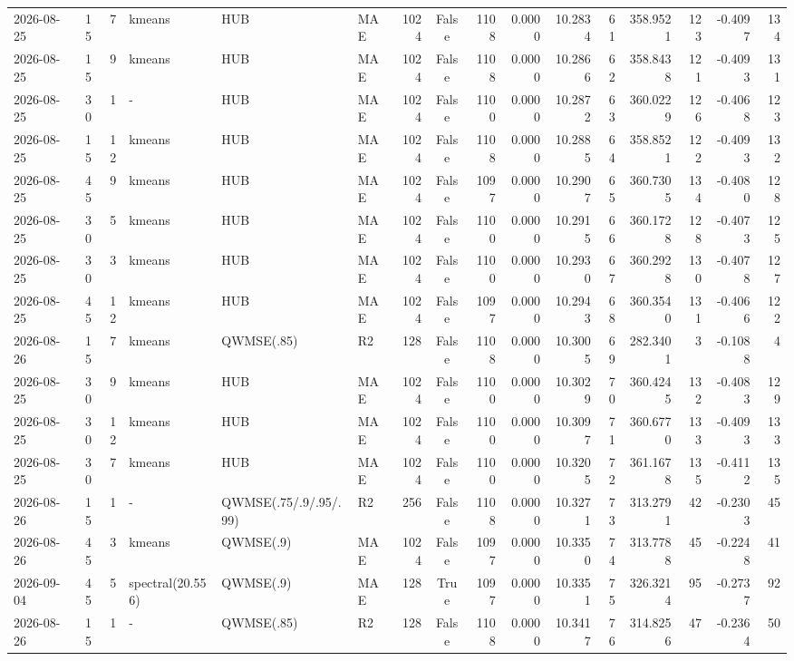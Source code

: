 \documentclass[10pt]{article}
\begin{document}
\begin{landscape}
\begin{longtable}{@{}lrrlllrcrrrrrrrr@{}}
2026-08-25 & 15 & 7 & kmeans & HUB & MAE & 1024 & False & 1108 & 0.0000 & 10.2834 & 61 & 358.9521 & 123 & -0.4097 & 134 \\
2026-08-25 & 15 & 9 & kmeans & HUB & MAE & 1024 & False & 1108 & 0.0000 & 10.2866 & 62 & 358.8438 & 121 & -0.4093 & 131 \\
2026-08-25 & 30 & 1 & - & HUB & MAE & 1024 & False & 1100 & 0.0000 & 10.2872 & 63 & 360.0229 & 126 & -0.4068 & 123 \\
2026-08-25 & 15 & 12 & kmeans & HUB & MAE & 1024 & False & 1108 & 0.0000 & 10.2885 & 64 & 358.8521 & 122 & -0.4093 & 132 \\
2026-08-25 & 45 & 9 & kmeans & HUB & MAE & 1024 & False & 1097 & 0.0000 & 10.2907 & 65 & 360.7305 & 134 & -0.4080 & 128 \\
2026-08-25 & 30 & 5 & kmeans & HUB & MAE & 1024 & False & 1100 & 0.0000 & 10.2915 & 66 & 360.1728 & 128 & -0.4073 & 125 \\
2026-08-25 & 30 & 3 & kmeans & HUB & MAE & 1024 & False & 1100 & 0.0000 & 10.2930 & 67 & 360.2928 & 130 & -0.4078 & 127 \\
2026-08-25 & 45 & 12 & kmeans & HUB & MAE & 1024 & False & 1097 & 0.0000 & 10.2943 & 68 & 360.3540 & 131 & -0.4066 & 122 \\
2026-08-26 & 15 & 7 & kmeans & QWMSE(.85) & R2 & 128 & False & 1108 & 0.0000 & 10.3005 & 69 & 282.3401 & 3 & -0.1088 & 4 \\
2026-08-25 & 30 & 9 & kmeans & HUB & MAE & 1024 & False & 1100 & 0.0000 & 10.3029 & 70 & 360.4245 & 132 & -0.4083 & 129 \\
2026-08-25 & 30 & 12 & kmeans & HUB & MAE & 1024 & False & 1100 & 0.0000 & 10.3097 & 71 & 360.6770 & 133 & -0.4093 & 133 \\
2026-08-25 & 30 & 7 & kmeans & HUB & MAE & 1024 & False & 1100 & 0.0000 & 10.3205 & 72 & 361.1678 & 135 & -0.4112 & 135 \\
2026-08-26 & 15 & 1 & - & QWMSE(.75/.9/.95/.99) & R2 & 256 & False & 1108 & 0.0000 & 10.3271 & 73 & 313.2791 & 42 & -0.2303 & 45 \\
2026-08-26 & 45 & 3 & kmeans & QWMSE(.9) & MAE & 1024 & False & 1097 & 0.0000 & 10.3350 & 74 & 313.7788 & 45 & -0.2248 & 41 \\
2026-09-04 & 45 & 5 & spectral(20.556) & QWMSE(.9) & MAE & 128 & True & 1097 & 0.0000 & 10.3351 & 75 & 326.3214 & 95 & -0.2737 & 92 \\
2026-08-26 & 15 & 1 & - & QWMSE(.85) & R2 & 128 & False & 1108 & 0.0000 & 10.3417 & 76 & 314.8256 & 47 & -0.2364 & 50 \\

\end{longtable}
\end{landscape}
\end{document}
